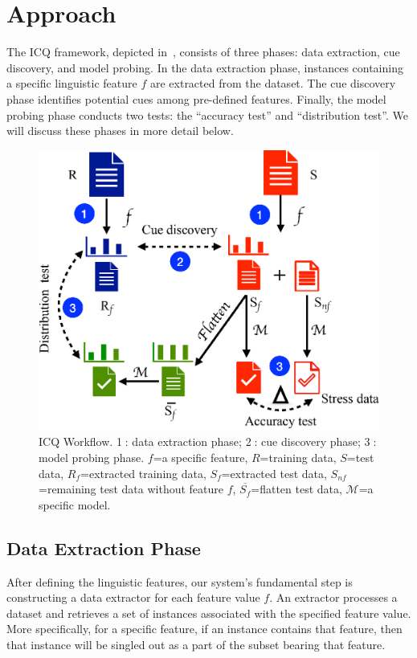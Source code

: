 \section{Approach}
\label{sec:approach}

The ICQ framework, depicted in~, 
consists of three phases: data extraction, cue discovery, and model probing. 
In the data extraction phase, instances containing a 
specific linguistic feature $f$ are extracted from the dataset. 
The cue discovery phase identifies potential cues among pre-defined features. 
Finally, the model probing phase conducts two tests: 
the ``accuracy test'' and ``distribution test''. 
We will discuss these phases in more detail below.

\begin{figure}[th]
\centering
\includegraphics[width=0.95\columnwidth]{picture/framework.eps}
\caption{ICQ Workflow. \textcircled{1}: data extraction phase; \textcircled{2}: cue discovery phase; 
\textcircled{3}: model probing phase. $f$=a specific feature, $R$=training data, $S$=test data, $R_f$=extracted training data, 
$S_f$=extracted test data, $S_{nf}$=remaining test data without feature $f$, $\overline{S_f}$=flatten test data, $\mathcal{M}$=a specific model.}
\label{fig:framework}
\end{figure}


\subsection{Data Extraction Phase}
\label{sec:evaldata}
After defining the linguistic features, our system's fundamental step 
is constructing a data extractor for each feature value $f$. 
An extractor processes a dataset and retrieves a set of 
instances associated with the specified feature value. 
More specifically, for a specific feature, if an instance contains that feature, then that instance will be singled out as a part of the subset bearing that feature.


